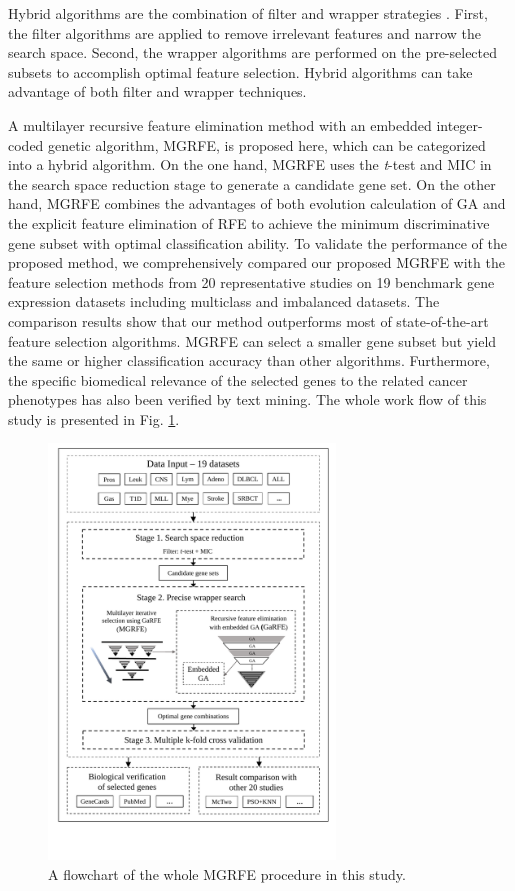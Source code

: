 \documentclass[10pt,journal,compsoc]{IEEEtran}
\begin{document}
	Hybrid algorithms are the combination of filter and wrapper strategies \cite{W6}. First, the filter algorithms are applied to remove irrelevant features and narrow the search space. Second, the wrapper algorithms are performed on the pre-selected subsets to accomplish optimal feature selection. Hybrid algorithms can take advantage of both filter and wrapper techniques.
	
	A multilayer recursive feature elimination method with an embedded integer-coded genetic algorithm, MGRFE, is proposed here, which can be categorized into a hybrid algorithm. On the one hand, MGRFE uses the \textit{t}-test and MIC in the search space reduction stage to generate a candidate gene set. On the other hand, MGRFE combines the advantages of both evolution calculation of GA and the explicit feature elimination of RFE to achieve the minimum discriminative gene subset with optimal classification ability.
	To validate the performance of the proposed method, we comprehensively compared our proposed MGRFE with the feature selection methods from 20 representative studies on 19 benchmark gene expression datasets including multiclass and imbalanced datasets. The comparison results show that our method outperforms most of state-of-the-art feature selection algorithms. MGRFE can select a smaller gene subset but yield the same or higher classification accuracy than other algorithms. Furthermore, the specific biomedical relevance of the selected genes to the related cancer phenotypes has also been verified by text mining. The whole work flow of this study is presented in Fig. \ref{Fig:MGRFE_whole}.

	
	\begin{figure}[!htbp]
		\centering
		\includegraphics[width=0.68\textwidth]{pictures/MGRFE-whole.pdf}
		\caption{A flowchart of the whole MGRFE procedure in this study.}
		\label{Fig:MGRFE_whole}
	\end{figure}
	
\end{document}
